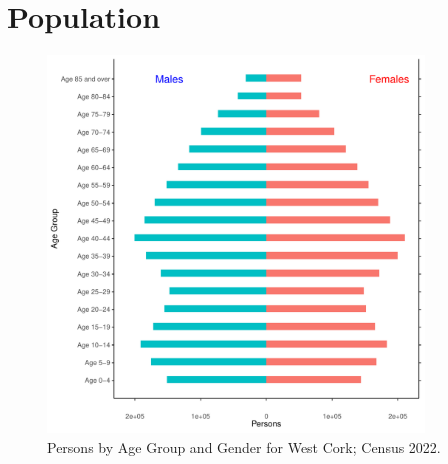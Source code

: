 \documentclass{article}
\begin{document}
\pagebreak

\section{Population} 
\label{sect:Pop}

\begin{figure}[h]
	\centering
	\includegraphics[width = 100mm]{../figures/PyramidPlot.pdf}
	\caption{Persons by Age Group and Gender for West Cork; Census 2022.}
	\label{fig:2ae19629-1a6a-13a3-e055-000000000001}
	\end{figure}
\end{document}
